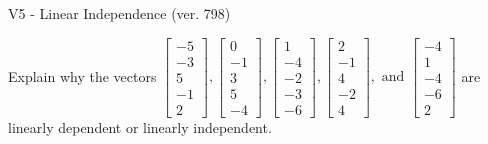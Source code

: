 \begin{exercise}
  \begin{exerciseTitle}V5 - Linear Independence (ver. 798)\end{exerciseTitle}
  \begin{exerciseStatement}
    Explain why the vectors \(\left[\begin{array}{r}
-5 \\
-3 \\
5 \\
-1 \\
2
\end{array}\right] , \left[\begin{array}{r}
0 \\
-1 \\
3 \\
5 \\
-4
\end{array}\right] , \left[\begin{array}{r}
1 \\
-4 \\
-2 \\
-3 \\
-6
\end{array}\right] , \left[\begin{array}{r}
2 \\
-1 \\
4 \\
-2 \\
4
\end{array}\right] , \text{ and } \left[\begin{array}{r}
-4 \\
1 \\
-4 \\
-6 \\
2
\end{array}\right]\) are linearly dependent or linearly independent.	



\end{exerciseStatement}
\end{exercise}
